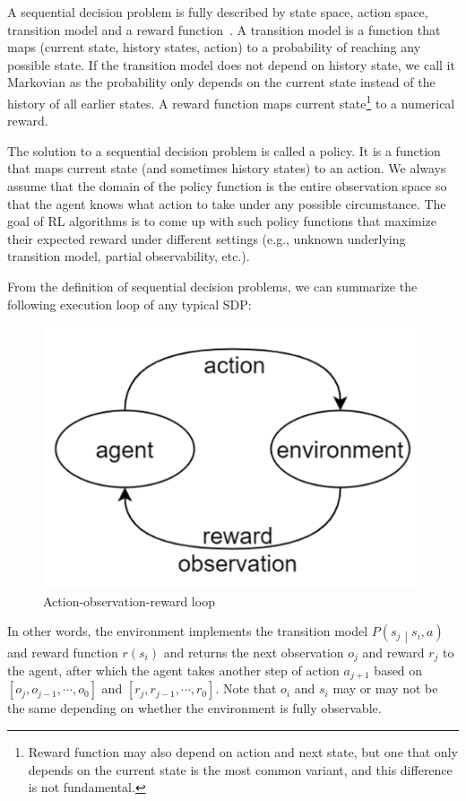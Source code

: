 A sequential decision problem is fully described by state space, action space, transition model and a reward function~\parencite{russell}. A transition model is a function that maps (current state, history states, action) to a probability of reaching any possible state. If the transition model does not depend on history state, we call it Markovian as the probability only depends on the current state instead of the history of all earlier states. A reward function maps current state\footnote{Reward function may also depend on action and next state, but one that only depends on the current state is the most common variant, and this difference is not fundamental.} to a numerical reward.

The solution to a sequential decision problem is called a policy. It is a function that maps current state (and sometimes history states) to an action. We always assume that the domain of the policy function is the entire observation space so that the agent knows what action to take under any possible circumstance. The goal of RL algorithms is to come up with such policy functions that maximize their expected reward under different settings (e.g., unknown underlying transition model, partial observability, etc.).

From the definition of sequential decision problems, we can summarize the following execution loop of any typical SDP:

\begin{figure}[H]
    \centering
    \includegraphics{images/obr-loop.png}
    \caption{Action-observation-reward loop}
    \label{fig:obr-loop}
\end{figure}

In other words, the environment implements the transition model $P\left(s_j\middle| s_i,a\right)$ and reward function $r\left(s_i\right)$ and returns the next observation $o_j$ and reward $r_j$ to the agent, after which the agent takes another step of action $a_{j+1}$ based on $\left[o_j,o_{j-1},\cdots,o_0\right]$ and $\left[r_j,r_{j-1},\cdots,r_0\right]$. Note that $o_i$ and $s_i$ may or may not be the same depending on whether the environment is fully observable.

